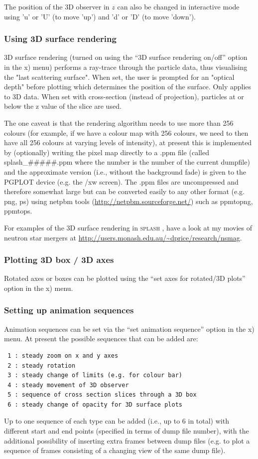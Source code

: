 \documentclass[a4paper,10pt]{article}
\newcommand{\splash}{\textsc{splash }}
\begin{document}
 The position of the 3D observer in $z$ can also be changed in interactive mode using 'u' or 'U' (to move 'up') and 'd' or 'D' (to move 'down'). 

\subsubsection{ Using 3D surface rendering}
 3D surface rendering (turned on using the ``3D surface rendering on/off'' option in the x) menu) performs a ray-trace through the particle data, thus visualising the "last scattering surface". When set, the user is prompted for an "optical depth" before plotting which determines the position of the surface. Only applies to 3D data. When set with cross-section (instead of projection), particles at or below the z value of the slice are used.

The one caveat is that the rendering algorithm needs to use more than 256 colours (for example, if we have a colour map with 256 colours, we need to then have all 256 colours at varying levels of intensity), at present this is implemented by
(optionally) writing the pixel map directly to a .ppm file (called splash\_\#\#\#\#\#.ppm where the number is the number of the current dumpfile) and the approximate version (i.e., without the background fade)
is given to the PGPLOT device (e.g. the /xw screen). The .ppm files are uncompressed and therefore somewhat large but can be converted easily to any
other format (e.g. png, ps) using netpbm tools (\url{http://netpbm.sourceforge.net/}) such as
ppmtopng, ppmtops.

 For examples of the 3D surface rendering in \splash, have a look at my movies of neutron star mergers at \url{http://users.monash.edu.au/~dprice/research/nsmag}.

\subsubsection{ Plotting 3D box / 3D axes}
Rotated axes or boxes can be plotted using the ``set axes for rotated/3D plots'' option in the x) menu.

\subsubsection{ Setting up animation sequences}
\label{sec:animseq}
 Animation sequences can be set via the ``set animation sequence'' option in the x) menu. At present the possible sequences that can be added are:
\begin{verbatim}
 1 : steady zoom on x and y axes                       
 2 : steady rotation                                   
 3 : steady change of limits (e.g. for colour bar)     
 4 : steady movement of 3D observer                    
 5 : sequence of cross section slices through a 3D box 
 6 : steady change of opacity for 3D surface plots
\end{verbatim}
 Up to one sequence of each type can be added (i.e., up to 6 in total) with different start and end points (specified in terms of dump file number), with the additional possibility of inserting extra frames between dump files (e.g. to plot a sequence of frames consisting of a changing view of the same dump file). 
 
\end{document}
